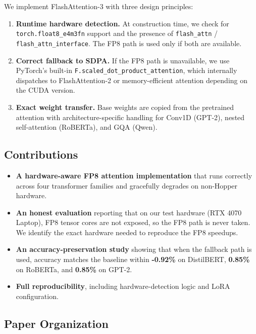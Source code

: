 We implement FlashAttention-3 with three design principles:

\begin{enumerate}
\item \textbf{Runtime hardware detection.} At construction time, we check for
  \texttt{torch.float8\_e4m3fn} support and the presence of \texttt{flash\_attn} /
  \texttt{flash\_attn\_interface}. The FP8 path is used only if both are available.

\item \textbf{Correct fallback to SDPA.} If the FP8 path is unavailable, we use
  PyTorch's built-in \texttt{F.scaled\_dot\_product\_attention}, which internally
  dispatches to FlashAttention-2 or memory-efficient attention depending on
  the CUDA version.

\item \textbf{Exact weight transfer.} Base weights are copied from the pretrained
  attention with architecture-specific handling for Conv1D (GPT-2), nested
  self-attention (RoBERTa), and GQA (Qwen).

\end{enumerate}
\subsection{Contributions}

\begin{itemize}
\item \textbf{A hardware-aware FP8 attention implementation} that runs correctly
  across four transformer families and gracefully degrades on non-Hopper
  hardware.
\item \textbf{An honest evaluation} reporting that on our test hardware (RTX 4070
  Laptop), FP8 tensor cores are not exposed, so the FP8 path is never
  taken. We identify the exact hardware needed to reproduce the FP8
  speedups.
\item \textbf{An accuracy-preservation study} showing that when the fallback path is
  used, accuracy matches the baseline within \textbf{-0.92\%} on DistilBERT,
  \textbf{0.85\%} on RoBERTa, and \textbf{0.85\%} on GPT-2.
\item \textbf{Full reproducibility}, including hardware-detection logic and LoRA
  configuration.

\end{itemize}
\subsection{Paper Organization}

